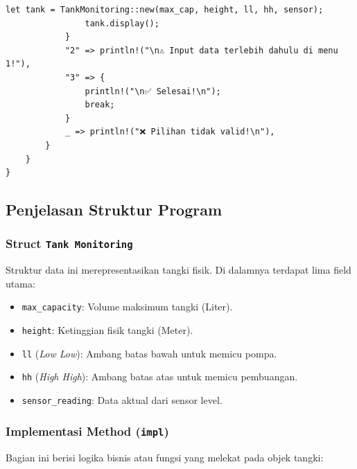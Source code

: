 \documentclass[12pt,a4paper]{article}
\begin{document}
\begin{lstlisting}[caption=Implementasi Lengkap Sistem Monitoring Tangki dalam Rust]
                let tank = TankMonitoring::new(max_cap, height, ll, hh, sensor);
                tank.display();
            }
            "2" => println!("\n⚠️ Input data terlebih dahulu di menu 1!"),
            "3" => {
                println!("\n✅ Selesai!\n");
                break;
            }
            _ => println!("❌ Pilihan tidak valid!\n"),
        }
    }
}
\end{lstlisting}

\subsection{Penjelasan Struktur Program}

\subsubsection{Struct \texttt{Tank Monitoring}}
Struktur data ini merepresentasikan tangki fisik. Di dalamnya terdapat lima field utama:
\begin{itemize}
    \item \texttt{max\_capacity}: Volume maksimum tangki (Liter).
    \item \texttt{height}: Ketinggian fisik tangki (Meter).
    \item \texttt{ll} (\textit{Low Low}): Ambang batas bawah untuk memicu pompa.
    \item \texttt{hh} (\textit{High High}): Ambang batas atas untuk memicu pembuangan.
    \item \texttt{sensor\_reading}: Data aktual dari sensor level.
\end{itemize}

\subsubsection{Implementasi Method (\texttt{impl})}
Bagian ini berisi logika bisnis atau fungsi yang melekat pada objek tangki:
\end{document}

